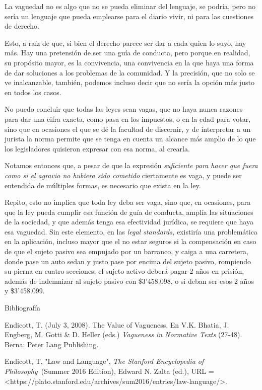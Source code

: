 \documentclass[]{book}
\begin{document}
La vaguedad no es algo que no se pueda eliminar del lenguaje, se podría,
pero no sería un lenguaje que pueda emplearse para el diario vivir, ni
para las cuestiones de derecho.

Esto, a raíz de que, si bien el derecho parece ser dar a cada quien lo
suyo, hay más. Hay una pretensión de ser una guía de conducta, pero
porque en realidad, su propósito mayor, es la convivencia, una
convivencia en la que haya una forma de dar soluciones a los problemas
de la comunidad. Y la precisión, que no solo se ve inalcanzable,
también, podemos incluso decir que no sería la opción más justo en todos
los casos.

No puedo concluir que todas las leyes sean vagas, que no haya nunca
razones para dar una cifra exacta, como pasa en los impuestos, o en la
edad para votar, sino que en ocasiones el que se dé la facultad de
discernir, y de interpretar a un jurista la norma permite que se tenga
en cuenta un alcance más amplio de lo que los legisladores quisieron
expresar con esa norma, al crearla.

Notamos entonces que, a pesar de que la expresión \emph{suficiente para
hacer que fuera como si el agravio no hubiera sido cometido} ciertamente
es vaga, y puede ser entendida de múltiples formas, es necesario que
exista en la ley.

Repito, esto no implica que toda ley deba ser vaga, sino que, en
ocasiones, para que la ley pueda cumplir esa función de guía de
conducta, amplía las situaciones de la sociedad, y que además tenga esa
efectividad jurídica, se requiere que haya esa vaguedad. Sin este
elemento, en las \emph{legal standards,} existiría una problemática en
la aplicación, incluso mayor que el no estar seguros si la compensación
en caso de que el sujeto pasivo sea empujado por un barranco, y caiga a
una carretera, donde pase un auto sedan y justo pase por encima del
sujeto pasivo, rompiendo su pierna en cuatro secciones; el sujeto activo
deberá pagar 2 años en prisión, además de indemnizar al sujeto pasivo
con \$3'458.098, o si deban ser esos 2 años y \$3'458.099.

Bibliografía

Endicott, T. (July 3, 2008). The Value of Vagueness. En V.K. Bhatia, J.
Engberg, M. Gotti \& D. Heller (eds.) \emph{Vagueness in Normative
Texts} (27-48). Berna: Peter Lang Publishing.

Endicott, T, "Law and Language", \emph{The Stanford Encyclopedia of
Philosophy~}(Summer 2016 Edition), Edward N. Zalta (ed.), URL =
\textless{}https://plato.stanford.edu/archives/sum2016/entries/law-language/\textgreater{}.
\end{document}
